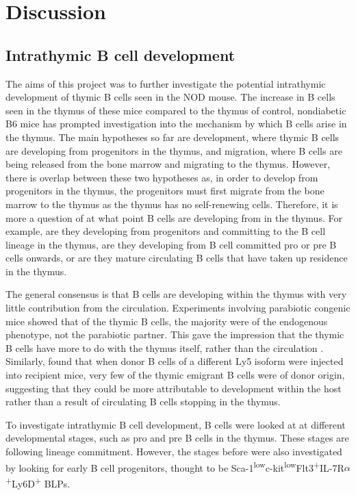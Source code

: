 
\chapter{Discussion}

\section{Intrathymic B cell development}
The aims of this project was to further investigate the potential intrathymic development of thymic B cells seen in the NOD mouse.
The increase in B cells seen in the thymus of these mice compared to the thymus of control, nondiabetic B6 mice has prompted investigation into the mechanism by which B cells arise in the thymus.
The main hypotheses so far are development, where thymic B cells are developing from progenitors in the thymus, and migration, where B cells are being released from the bone marrow and migrating to the thymus.
However, there is overlap between these two hypotheses as, in order to develop from progenitors in the thymus, the progenitors must first migrate from the bone marrow to the thymus as the thymus has no self-renewing cells.
Therefore, it is more a question of at what point B cells are developing from in the thymus.
For example, are they developing from progenitors and committing to the B cell lineage in the thymus, are they developing from B cell committed pro or pre B cells onwards, or are they mature circulating B cells that have taken up residence in the thymus.

The general consensus is that B cells are developing within the thymus with very little contribution from the circulation.
Experiments involving parabiotic congenic mice showed that of the thymic B cells, the majority were of the endogenous phenotype, not the parabiotic partner. 
This gave the impression that the thymic B cells have more to do with the thymus itself, rather than the circulation \citep{Perera2013}.
Similarly, \citet{Akashi2000} found that when donor B cells of a different Ly5 isoform were injected into recipient mice, very few of the thymic emigrant B cells were of donor origin, suggesting that they could be more attributable to development within the host rather than a result of circulating B cells stopping in the thymus.

To investigate intrathymic B cell development, B cells were looked at at different developmental stages, such as pro and pre B cells in the thymus.
These stages are following lineage commitment.
However, the stages before were also investigated by looking for early B cell progenitors, thought to be Sca-1\textsuperscript{low}c-kit\textsuperscript{low}Flt3\textsuperscript{+}IL-7R$\alpha$\textsuperscript{+}Ly6D\textsuperscript{+} BLPs.

